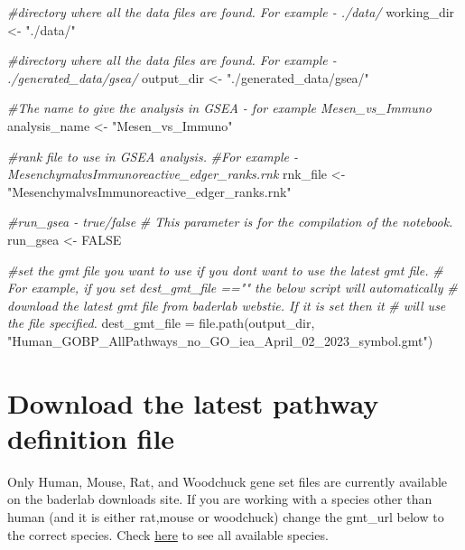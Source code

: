 \documentclass[
]{book}
\newenvironment{Shaded}{\begin{snugshade}}{\end{snugshade}}
\newcommand{\CommentTok}[1]{\textcolor[rgb]{0.56,0.35,0.01}{\textit{#1}}}
\newcommand{\ConstantTok}[1]{\textcolor[rgb]{0.00,0.00,0.00}{#1}}
\newcommand{\FunctionTok}[1]{\textcolor[rgb]{0.00,0.00,0.00}{#1}}
\newcommand{\NormalTok}[1]{#1}
\newcommand{\OtherTok}[1]{\textcolor[rgb]{0.56,0.35,0.01}{#1}}
\newcommand{\StringTok}[1]{\textcolor[rgb]{0.31,0.60,0.02}{#1}}
\begin{document}
\begin{Shaded}
\begin{Highlighting}[]
\CommentTok{\#directory where all the data files are found.  For example {-}   ./data/ }
\NormalTok{working\_dir }\OtherTok{\textless{}{-}} \StringTok{"./data/"}

\CommentTok{\#directory where all the data files are found.  For example {-}   ./generated\_data/gsea/}
\NormalTok{output\_dir }\OtherTok{\textless{}{-}} \StringTok{"./generated\_data/gsea/"}

\CommentTok{\#The name to give the analysis in GSEA {-} for example Mesen\_vs\_Immuno}
\NormalTok{analysis\_name }\OtherTok{\textless{}{-}} \StringTok{"Mesen\_vs\_Immuno"}

\CommentTok{\#rank file to use in GSEA analysis.  }
\CommentTok{\#For example {-} MesenchymalvsImmunoreactive\_edger\_ranks.rnk}
\NormalTok{rnk\_file }\OtherTok{\textless{}{-}} \StringTok{"MesenchymalvsImmunoreactive\_edger\_ranks.rnk"}

\CommentTok{\#run\_gsea {-} true/false}
\CommentTok{\# This parameter is for the compilation of the notebook.  }
\NormalTok{run\_gsea }\OtherTok{\textless{}{-}} \ConstantTok{FALSE}

\CommentTok{\#set the gmt file you want to use if you don\textquotesingle{}t want to use the latest gmt file.}
\CommentTok{\# For example, if you set dest\_gmt\_file =="" the below script will automatically}
\CommentTok{\# download the latest gmt file from baderlab webstie.  If it is set then it}
\CommentTok{\# will use the file specified.  }
\NormalTok{dest\_gmt\_file }\OtherTok{=} \FunctionTok{file.path}\NormalTok{(output\_dir, }
                          \StringTok{"Human\_GOBP\_AllPathways\_no\_GO\_iea\_April\_02\_2023\_symbol.gmt"}\NormalTok{)}
\end{Highlighting}
\end{Shaded}

\hypertarget{download-the-latest-pathway-definition-file}{%
\section{Download the latest pathway definition file}\label{download-the-latest-pathway-definition-file}}

Only Human, Mouse, Rat, and Woodchuck gene set files are currently available on the baderlab downloads site. If you are working with a species other than human (and it is either rat,mouse or woodchuck) change the gmt\_url below to the correct species. Check \href{http://download.baderlab.org/EM_Genesets/current_release/}{here} to see all available species.
\end{document}
